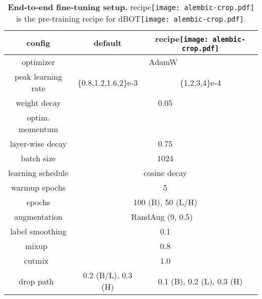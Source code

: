 \documentclass[10pt,twocolumn,letterpaper]{article}
\def \alambic {\texttt{[image: alembic-crop.pdf]}\xspace}
\def\ourmethoddis{dBOT\alambic\xspace}
\begin{document}
\begin{table}[t]
    \begin{center}
    \setlength{\tabcolsep}{0.2mm}
	\begin{tabular}{c|cc}
	\toprule
		config & \hspace{0.8cm}default & \hspace{0.8cm} recipe\alambic \hspace{0.8cm} \\
        \hline
		optimizer & \multicolumn{2}{c}{AdamW~\cite{adamw}} \\
        peak learning rate & \{0.8,1.2,1.6,2\}e-3 & \{1,2,3,4\}e-4 \\
		weight decay & \multicolumn{2}{c}{0.05} \\
		optim. momentum & \multicolumn{2}{c}{} \\
		layer-wise decay & \multicolumn{2}{c}{0.75} \\
		batch size & \multicolumn{2}{c}{1024} \\
		learning schedule & \multicolumn{2}{c}{cosine decay} \\
		warmup epochs & \multicolumn{2}{c}{5} \\
		epochs & \multicolumn{2}{c}{100 (B), 50 (L/H)} \\
		augmentation & \multicolumn{2}{c}{RandAug (9, 0.5) ~\cite{randaug}} \\
		label smoothing & \multicolumn{2}{c}{0.1} \\
		mixup~\cite{mixup} & \multicolumn{2}{c}{0.8} \\
		cutmix~\cite{cutmix} & \multicolumn{2}{c}{1.0} \\
		drop path~\cite{droppath} & 0.2 (B/L), 0.3 (H) & 0.1 (B), 0.2 (L), 0.3 (H) \\
		\bottomrule
	\end{tabular}
 \end{center}
	\caption{\textbf{End-to-end fine-tuning setup.} recipe\alambic is the pre-training recipe for \ourmethoddis.}
	\label{tab:app:fine-tune}
\end{table}
\end{document}

